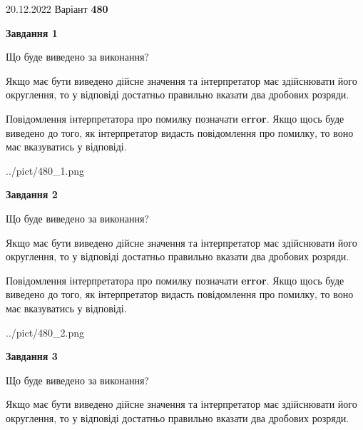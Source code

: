 \documentclass[12pt, ukrainian]{article}
\begin{document}
{20.12.2022 Варіант \No \textbf { 480 }\par}
{
\begin {Large}

{\begin {center}\textbf{Завдання 1}\end {center}}\par
Що буде виведено за виконання? \par

Якщо має бути виведено дійсне значення та інтерпретатор має здійснювати його округлення, 
то у відповіді достатньо правильно вказати два дробових розряди.

Повідомлення інтерпретатора про помилку позначати \textbf{error}.
Якщо щось буде виведено до того, як інтерпретатор видасть повідомлення про помилку, 
то воно має вказуватись у відповіді. \par

\begin{center}
	{../pict/480_1.png}
\end{center}
\newpage

{\begin {center}\textbf{Завдання 2}\end {center}}\par
Що буде виведено за виконання? \par

Якщо має бути виведено дійсне значення та інтерпретатор має здійснювати його округлення, 
то у відповіді достатньо правильно вказати два дробових розряди.

Повідомлення інтерпретатора про помилку позначати \textbf{error}.
Якщо щось буде виведено до того, як інтерпретатор видасть повідомлення про помилку, 
то воно має вказуватись у відповіді. \par

\begin{center}
	{../pict/480_2.png}
\end{center}
\newpage

{\begin {center}\textbf{Завдання 3}\end {center}}\par
Що буде виведено за виконання? \par

Якщо має бути виведено дійсне значення та інтерпретатор має здійснювати його округлення, 
то у відповіді достатньо правильно вказати два дробових розряди.


\end{Large}}
\end{document}
